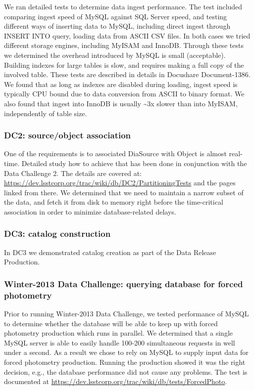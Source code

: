 \documentclass[DM,lsstdraft,toc]{lsstdoc}
\begin{document}
We ran detailed tests to determine data ingest performance. The test
included comparing ingest speed of MySQL against SQL Server speed, and
testing different ways of inserting data to MySQL, including direct
ingest through INSERT INTO query, loading data from ASCII CSV files. In
both cases we tried different storage engines, including MyISAM and
InnoDB. Through these tests we determined the overhead introduced by
MySQL is small (acceptable). Building indexes for large tables is slow,
and requires making a full copy of the involved table. These tests are
described in details in Docushare Document-1386. We found that as long
as indexes are disabled during loading, ingest speed is typically CPU
bound due to data conversion from ASCII to binary format. We also found
that ingest into InnoDB is usually \textasciitilde{}3x slower than into
MyISAM, independently of table size.

\subsubsection{DC2: source/object
association}\label{dc2-sourceobject-association}

One of the requirements is to associated DiaSource with Object is almost
real-time. Detailed study how to achieve that has been done in
conjunction with the Data Challenge 2. The details are covered at:
\url{https://dev.lsstcorp.org/trac/wiki/db/DC2/PartitioningTests} and
the pages linked from there. We determined that we need to maintain a
narrow subset of the data, and fetch it from disk to memory right before
the time-critical association in order to minimize database-related
delays.

\subsubsection{DC3: catalog
construction}\label{dc3-catalog-construction}

In DC3 we demonstrated catalog creation as part of the Data Release
Production.

\subsubsection{Winter-2013 Data Challenge: querying database for forced
photometry}\label{winter-2013-data-challenge-querying-database-for-forced-photometry}

Prior to running Winter-2013 Data Challenge, we tested performance of
MySQL to determine whether the database will be able to keep up with
forced photometry production which runs in parallel. We determined that
a single MySQL server is able to easily handle 100-200 simultaneous
requests in well under a second. As a result we chose to rely on MySQL
to supply input data for forced photometry production. Running the
production showed it was the right decision, e.g., the database
performance did not cause any problems. The test is documented at
\url{https://dev.lsstcorp.org/trac/wiki/db/tests/ForcedPhoto}.
\end{document}
